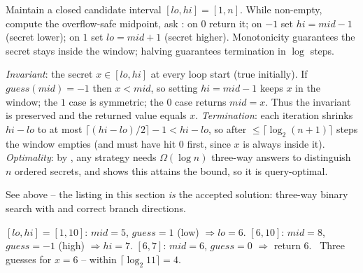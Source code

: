 \begin{thinkbox}
\end{thinkbox}

Maintain a closed candidate interval $[\mathit{lo},\mathit{hi}]=[1,n]$. While non-empty, compute the
overflow-safe midpoint, ask : on $0$ return it; on $-1$ set $\mathit{hi}=\mathit{mid}-1$
(secret lower); on $1$ set $\mathit{lo}=\mathit{mid}+1$ (secret higher). Monotonicity guarantees the
secret stays inside the window; halving guarantees termination in $\log$ steps.

\begin{proofbox}
\emph{Invariant}: the secret $x\in[\mathit{lo},\mathit{hi}]$ at every loop start (true initially). If
$\mathit{guess}(\mathit{mid})=-1$ then $x<\mathit{mid}$, so setting $\mathit{hi}=\mathit{mid}-1$ keeps
$x$ in the window; the $1$ case is symmetric; the $0$ case returns $\mathit{mid}=x$. Thus the invariant
is preserved and the returned value equals $x$. \emph{Termination}: each iteration shrinks
$\mathit{hi}-\mathit{lo}$ to at most $\lceil(\mathit{hi}-\mathit{lo})/2\rceil-1<\mathit{hi}-\mathit{lo}$,
so after $\le\lceil\log_2(n{+}1)\rceil$ steps the window empties (and must have hit $0$ first, since
$x$ is always inside it). \emph{Optimality}: by , any strategy needs
$\Omega(\log n)$ three-way answers to distinguish $n$ ordered secrets, and  shows
this attains the bound, so it is query-optimal. \end{proofbox}

See  above -- the listing in this section \emph{is} the accepted solution:
three-way binary search with  and correct branch directions.

\begin{tracebox}[Official $n=10, x=6$]
$[\mathit{lo},\mathit{hi}]=[1,10]$: $\mathit{mid}=5$, $\mathit{guess}=1$ (low) $\Rightarrow\mathit{lo}=6$.
$[6,10]$: $\mathit{mid}=8$, $\mathit{guess}=-1$ (high) $\Rightarrow\mathit{hi}=7$.
$[6,7]$: $\mathit{mid}=6$, $\mathit{guess}=0$ $\Rightarrow$ return $6$. \checkmark\ Three guesses for
$x=6$ -- within $\lceil\log_2 11\rceil=4$.
\end{tracebox}

